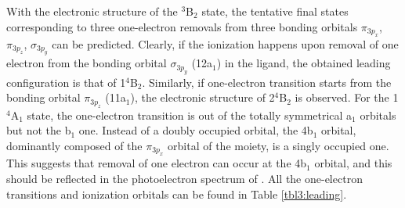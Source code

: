 \begin{refsection}
With the electronic structure of the $^3$B$_2$ state, the tentative final states corresponding to three one-electron removals from three bonding orbitals $\pi_{3p_x}$, $\pi_{3p_z}$, $\sigma_{3p_y}$ can be predicted. Clearly, if the ionization happens upon removal of one electron from the bonding orbital $\sigma_{3p_y}$ (12a$_1$) in the ligand, the obtained leading configuration is that of 1$^4$B$_2$. Similarly, if one-electron transition starts from the bonding orbital $\pi_{3p_z}$ (11a$_1$), the electronic structure of 2$^4$B$_2$ is observed. For the 1$^4$A$_1$ state, the one-electron transition is out of the totally symmetrical a$_1$ orbitals but not the b$_1$ one. Instead of a doubly occupied orbital, the 4b$_1$ orbital, dominantly composed of the $\pi_{3p_x}$ orbital of the  moiety, is a singly occupied one. This suggests that removal of one electron can occur at the 4b$_1$ orbital, and this should be reflected in the photoelectron spectrum of . All the one-electron transitions and ionization orbitals can be found in Table \ref{tbl3:leading}.




\end{refsection}

